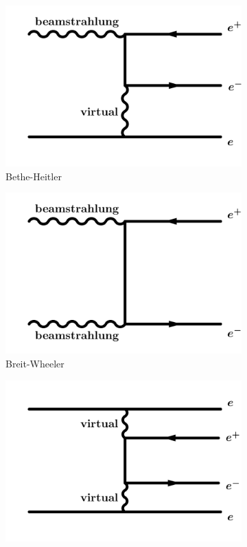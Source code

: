 \begin{figure}[h]
\begin{subfigure}[b]{0.33\textwidth}
\includegraphics[width=\textwidth]{Figures/Bethe-Heitler.pdf}
\caption{Bethe-Heitler}
\end{subfigure}
\begin{subfigure}[b]{0.33\textwidth}
\includegraphics[width=\textwidth]{Figures/Breit-Wheeler.pdf}
\caption{Breit-Wheeler}
\end{subfigure}
\begin{subfigure}[b]{0.33\textwidth}
\includegraphics[width=\textwidth]{Figures/Landau-Lifshitz.pdf}

\end{subfigure}
\end{figure}
